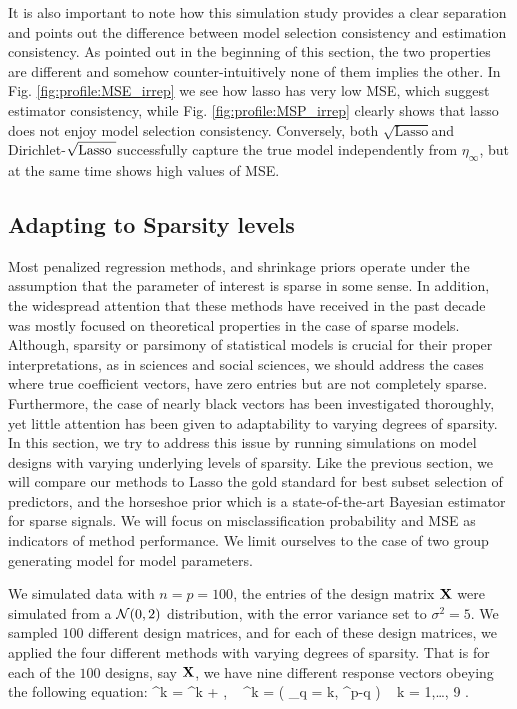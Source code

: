 \documentclass[10pt]{article}
\def\sql{$\sqrt{\text{Lasso}}$}
\def\sqdl{Dirichlet-$\sqrt{\text{\rm{Lasso} }}$}
\begin{document}
It is also important to note how this simulation study provides a clear separation and points out the difference between model selection consistency and estimation consistency. As pointed out in the beginning of this section, the two properties are different and somehow counter-intuitively none of them implies the other. In Fig. \ref{fig:profile:MSE_irrep} we see how lasso has very low MSE, which suggest estimator consistency, while Fig. \ref{fig:profile:MSP_irrep} clearly shows that lasso does not enjoy model selection consistency. Conversely, both \sql and \sqdl successfully capture the true model independently from $\eta_{\infty}$, but at the same time shows high values of MSE.



\subsection{Adapting to Sparsity levels}

Most penalized regression methods, and shrinkage priors operate under the assumption that the parameter of interest is sparse in some sense. In addition, the widespread attention that these methods have received in the past decade was mostly focused on theoretical properties in the case of sparse models. Although, sparsity or parsimony of statistical models is crucial for their proper interpretations, as in sciences
and social sciences, we should address the cases where true coefficient vectors, have zero entries but are not completely sparse. Furthermore, the case of nearly black vectors has been investigated thoroughly, yet little attention has been given to adaptability to varying degrees of sparsity. In this section, we try to address this issue by running simulations on model designs with varying underlying levels of sparsity. Like the previous section, we will compare our methods to Lasso the gold standard for best subset selection of predictors, and the horseshoe prior which is a state-of-the-art Bayesian estimator for sparse signals. We will focus on misclassification probability and MSE as indicators of method performance. We limit ourselves to the case of two group generating model for model parameters. 

We simulated data with $n = p = 100$, the entries of the design matrix ${\bf X}$ were simulated from a $\mathcal{N}(0 ,2)$ distribution, with the error variance set to $\sigma^2 = 5 $. We sampled $100$ different design matrices, and for each of these design matrices, we applied the four different methods with varying degrees of sparsity. That is for each of the $100$ designs, say ${\bf X}$, we have nine different response vectors obeying the following equation:
\beq\label{sparsity_mod}
\y^{k} = \X \bbeta^{k} + \bepsilon, \  \bbeta^{k} =  ( _{q = k}, ^{p-q} ) \  k = 1,\ldots, 9 .
\eeq
\end{document}
